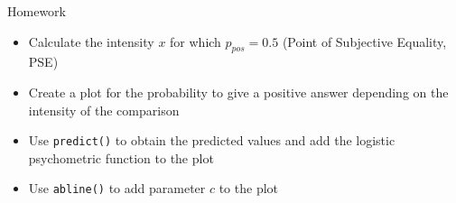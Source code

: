 \documentclass{beamer}
\begin{document}
\begin{frame}[fragile]{}
  \begin{block}{Homework}
    \begin{itemize}
      \item Calculate the intensity $x$ for which $p_{pos} = 0.5$ (Point of
        Subjective Equality, PSE)
      \item Create a plot for the probability to give a positive answer
        depending on the intensity of the comparison
      \item Use \texttt{predict()} to obtain the predicted values and add
        the logistic psychometric function to the plot
      \item Use \texttt{abline()} to add parameter $c$ to the plot
    \end{itemize}
  \end{block}
\end{frame}

% 
% 
\end{document}
